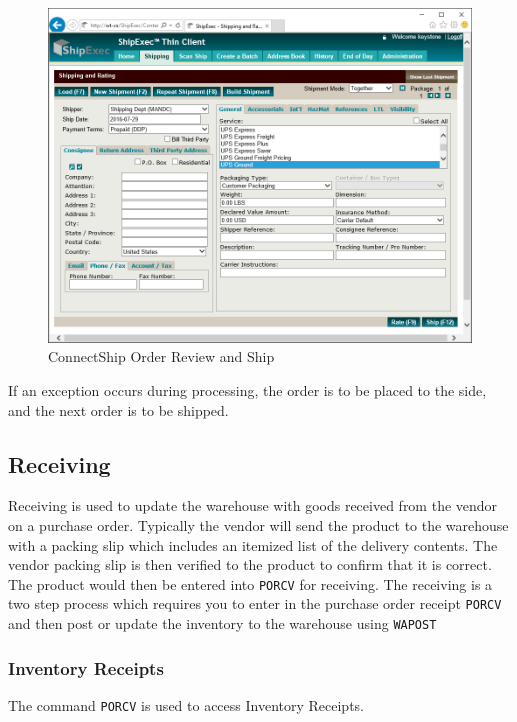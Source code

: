 \begin{figure}[H]
\includegraphics[width=\textwidth]{../img/image44}
\caption{ConnectShip Order Review and Ship}
\end{figure}

If an exception occurs during processing, the order is to be placed to the side, and the next order is to be shipped.

\pagebreak

\subsection{Receiving}

Receiving is used to update the warehouse with goods received from the vendor on a purchase order. Typically the vendor will send the product to the warehouse with a packing slip which includes an itemized list of the delivery contents. The vendor packing slip is then verified to the product to confirm that it is correct. The product would then be entered into \texttt{PORCV} for receiving. The receiving is a two step process which requires you to enter in the purchase order receipt \texttt{PORCV} and then post or update the inventory to the warehouse using \texttt{WAPOST}

\subsubsection{Inventory Receipts}


The command \texttt{PORCV} is used to access Inventory Receipts.

